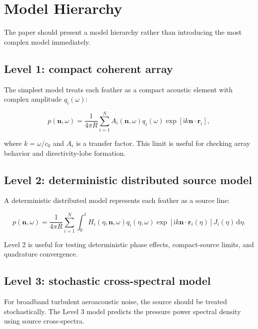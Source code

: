 \documentclass[11pt]{article}
\newcommand{\dd}{\,\mathrm{d}}
\newcommand{\ii}{\mathrm{i}}
\newcommand{\vect}[1]{\bm{#1}}
\begin{document}
\section{Model Hierarchy}

The paper should present a model hierarchy rather than introducing the most complex model immediately.

\subsection{Level 1: compact coherent array}

The simplest model treats each feather as a compact acoustic element with complex amplitude $q_i(\omega)$:

\begin{equation}
    p(\vect{n},\omega)
    =
    \frac{1}{4\pi R}
    \sum_{i=1}^{N}
    A_i(\vect{n},\omega)
    q_i(\omega)
    \exp\left[
        \ii k \vect{n}\cdot \vect{r}_i
    \right],
\end{equation}

where $k=\omega/c_0$ and $A_i$ is a transfer factor. This limit is useful for checking array behavior and directivity-lobe formation.

\subsection{Level 2: deterministic distributed source model}

A deterministic distributed model represents each feather as a source line:

\begin{equation}
    p(\vect{n},\omega)
    =
    \frac{1}{4\pi R}
    \sum_{i=1}^{N}
    \int_{0}^{1}
    H_i(\eta,\vect{n},\omega)
    q_i(\eta,\omega)
    \exp\left[
        \ii k \vect{n}\cdot \vect{r}_i(\eta)
    \right]
    J_i(\eta)\dd\eta.
\end{equation}

Level 2 is useful for testing deterministic phase effects, compact-source limits, and quadrature convergence.

\subsection{Level 3: stochastic cross-spectral model}

For broadband turbulent aeroacoustic noise, the source should be treated stochastically. The Level 3 model predicts the pressure power spectral density using source cross-spectra.
\end{document}
